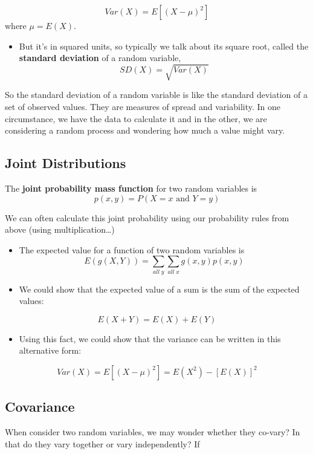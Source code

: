 \documentclass[]{book}
\providecommand{\tightlist}{%
  \setlength{\itemsep}{0pt}\setlength{\parskip}{0pt}}
\begin{document}
\[Var(X) = E[(X-\mu)^2]\]
where \(\mu = E(X)\).

\begin{itemize}
\tightlist
\item
  But it's in squared units, so typically we talk about its square root, called the \textbf{standard deviation} of a random variable,
  \[SD(X) = \sqrt{Var(X)}\]
\end{itemize}

So the standard deviation of a random variable is like the standard deviation of a set of observed values. They are measures of spread and variability. In one circumstance, we have the data to calculate it and in the other, we are considering a random process and wondering how much a value might vary.

\hypertarget{joint-distributions}{%
\subsection{Joint Distributions}\label{joint-distributions}}

The \textbf{joint probability mass function} for two random variables is
\[p(x,y) = P(X=x \text{ and }Y = y)\]

We can often calculate this joint probability using our probability rules from above (using multiplication\ldots{})

\begin{itemize}
\item
  The expected value for a function of two random variables is
  \[E(g(X,Y)) = \sum_{all\; y}\sum_{all\; x} g(x,y)p(x,y)\]
\item
  We could show that the expected value of a sum is the sum of the expected values:
\end{itemize}

\[E(X+Y) = E(X) + E(Y)\]

\begin{itemize}
\tightlist
\item
  Using this fact, we could show that the variance can be written in this alternative form:
\end{itemize}

\[Var(X) = E[(X-\mu)^2] = E(X^2) - [E(X)]^2\]

\hypertarget{covariance}{%
\subsection{Covariance}\label{covariance}}

When consider two random variables, we may wonder whether they co-vary? In that do they vary together or vary independently? If
\end{document}
